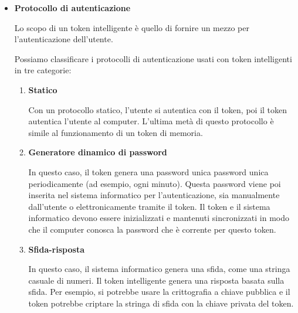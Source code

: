 \begin{itemize}
\begin{itemize}
        \item \textbf{Protocollo di autenticazione}
        
        Lo scopo di un token intelligente è quello di fornire un mezzo per l'autenticazione dell'utente.
        
        \newpage
        
        Possiamo classificare i protocolli di autenticazione usati con token intelligenti in tre categorie:
        
        \begin{enumerate}
            \item \textbf{Statico}
            
            Con un protocollo statico, l'utente si autentica con il token, poi il token autentica l'utente al computer. L'ultima metà di questo protocollo è simile al funzionamento di un token di memoria.
            
            \item \textbf{Generatore dinamico di password}
            
            In questo caso, il token genera una password unica password unica periodicamente (ad esempio, ogni minuto). Questa password viene poi inserita nel sistema informatico per l'autenticazione, sia manualmente dall'utente o elettronicamente tramite il token. Il token e il sistema informatico devono essere inizializzati e mantenuti sincronizzati in modo che il computer conosca la password che è corrente per questo token.
            
            \item \textbf{Sfida-risposta}
            
            In questo caso, il sistema informatico genera una sfida, come una stringa casuale di numeri. Il token intelligente genera una risposta basata sulla sfida. Per esempio, si potrebbe usare la crittografia a chiave pubblica e il token potrebbe criptare la stringa di sfida con la chiave privata del token.
        \end{enumerate}
    \end{itemize}
\end{itemize}
\newpage
